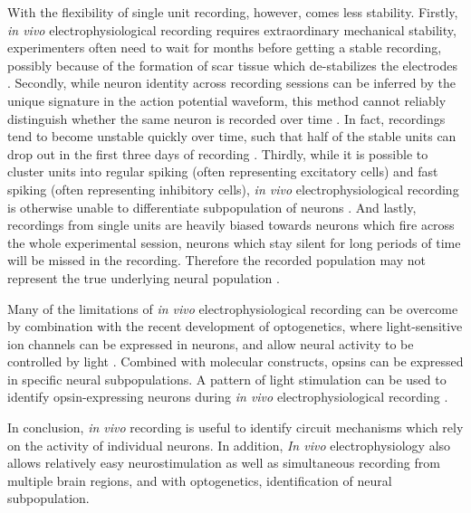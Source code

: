 With the flexibility of single unit recording, however, comes less stability. Firstly, \textit{in vivo} electrophysiological recording requires extraordinary mechanical stability, experimenters often need to wait for months before getting a stable recording, possibly because of the formation of scar tissue which de-stabilizes the electrodes \citep{jackson07}. Secondly, while neuron identity across recording sessions can be inferred by the unique signature in the action potential waveform, this method cannot reliably distinguish whether the same neuron is recorded over time \citep{rousche98, schmitzer-torbert04, tolias07}. In fact, recordings tend to become unstable quickly over time, such that half of the stable units can drop out in the first three days of recording \citep{fraser12}. Thirdly, while it is possible to cluster units into regular spiking (often representing excitatory cells) and fast spiking (often representing inhibitory cells), \textit{in vivo} electrophysiological recording is otherwise unable to differentiate subpopulation of neurons \citep{connors90}. And lastly, recordings from single units are heavily biased towards neurons which fire across the whole experimental session, neurons which stay silent for long periods of time will be missed in the recording. Therefore the recorded population may not represent the true underlying neural population \citep{lutcke13}. 

Many of the limitations of \textit{in vivo} electrophysiological recording can be overcome by combination with the recent development of optogenetics, where light-sensitive ion channels can be expressed in neurons, and allow neural activity to be controlled by light \citep{yizhar11}. Combined with molecular constructs, opsins can be expressed in specific neural subpopulations. A pattern of light stimulation can be used to identify opsin-expressing neurons during \textit{in vivo} electrophysiological recording \citep{zhao11}. 

In conclusion, \textit{in vivo} recording is useful to identify circuit mechanisms which rely on the activity of individual neurons. In addition, \textit{In vivo} electrophysiology also allows relatively easy neurostimulation as well as simultaneous recording from multiple brain regions, and with optogenetics, identification of neural subpopulation. 

